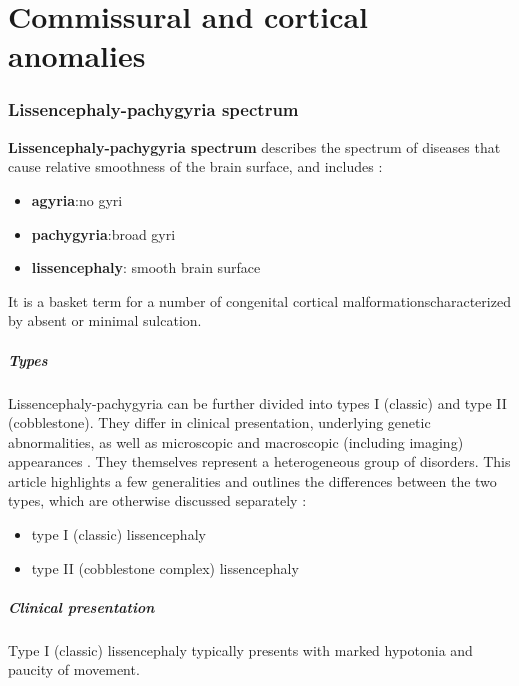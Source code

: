 \chapter{Commissural and cortical anomalies}

\subsection{Lissencephaly-pachygyria spectrum}

\textbf{Lissencephaly-pachygyria spectrum} describes the spectrum of diseases that cause relative smoothness of the brain surface, and includes :

\begin{itemize}
	\item
	\textbf{agyria}:no gyri
	\item
	\textbf{pachygyria}:broad gyri
	\item
	\textbf{lissencephaly}: smooth brain surface
\end{itemize}

It is a basket term for a number of congenital cortical malformationscharacterized by absent or minimal sulcation.

\paragraph{Types}

Lissencephaly-pachygyria can be further divided into types I (classic) and type II (cobblestone). They differ in clinical presentation, underlying genetic abnormalities, as well as microscopic and macroscopic (including imaging) appearances . They themselves represent a heterogeneous group of disorders. This article highlights a few generalities and outlines the differences between the two types, which are otherwise discussed separately :

\begin{itemize}
	\item
	type I (classic) lissencephaly
	\item
	type II (cobblestone complex) lissencephaly
\end{itemize}

\paragraph{Clinical presentation}

Type I (classic) lissencephaly typically presents with marked hypotonia and paucity of movement.

